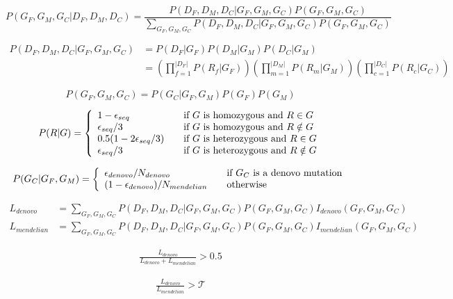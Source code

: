 \documentclass{article}
\begin{document}
\begin{equation}\label{eqn:model}
P(G_F,G_M,G_C|D_F,D_M,D_C) =  \frac{P(D_F,D_M,D_C|G_F,G_M,G_C)P(G_F,G_M,G_C)}{\sum_{G_F,G_M,G_C}P(D_F,D_M,D_C|G_F,G_M,G_C)P(G_F,G_M,G_C)}
\end{equation}


\begin{align}\label{eqn:model}
P(D_F,D_M,D_C|G_F,G_M,G_C) &= P(D_F|G_F)P(D_M|G_M)P(D_C|G_M) \\
	&= \left(\prod_{f=1}^{|D_F|}P(R_f|G_F)\right)\left(\prod_{m=1}^{|D_M|}P(R_m|G_M)\right)\left(\prod_{c=1}^{|D_C|}P(R_c|G_C)\right)
\end{align}

\begin{equation}\label{eqn:model}
P(G_F,G_M,G_C) = P(G_C|G_F,G_M)P(G_F)P(G_M)
\end{equation}

\[ P(R|G) = \left\{ 
  \begin{array}{l l}
    1-\epsilon_{seq} & \quad \text{if $G$ is homozygous and $R \in G$}\\
    \epsilon_{seq}/3 & \quad \text{if $G$ is homozygous and $R \notin G$}\\    
      0.5(1-2\epsilon_{seq}/3) & \quad \text{if $G$ is heterozygous and $R \in G$}\\
    \epsilon_{seq}/3 & \quad \text{if $G$ is heterozygous and $R \notin G$}
  \end{array} \right.\]
  

\[ P(G_C|G_F,G_M) = \left\{ 
  \begin{array}{l l}
    \epsilon_{denovo}/N_{denovo} & \quad \text{if $G_C$ is a denovo mutation}\\
    (1-\epsilon_{denovo})/N_{mendelian} & \quad \text{otherwise}
  \end{array} \right.\]

\begin{align*}
L_{denovo} &= \sum_{G_F,G_M,G_C}P(D_F,D_M,D_C|G_F,G_M,G_C)P(G_F,G_M,G_C)I_{denovo}(G_F,G_M,G_C)\\
L_{mendelian} &= \sum_{G_F,G_M,G_C}P(D_F,D_M,D_C|G_F,G_M,G_C)P(G_F,G_M,G_C)I_{mendelian}(G_F,G_M,G_C)
\end{align*}

\begin{align}
\frac{L_{denovo}}{L_{denovo} + L_{mendelian}} > 0.5
\end{align}

\begin{align}
\frac{L_{denovo}}{L_{mendelian}} > \mathcal{T}
\end{align}
\end{document}
